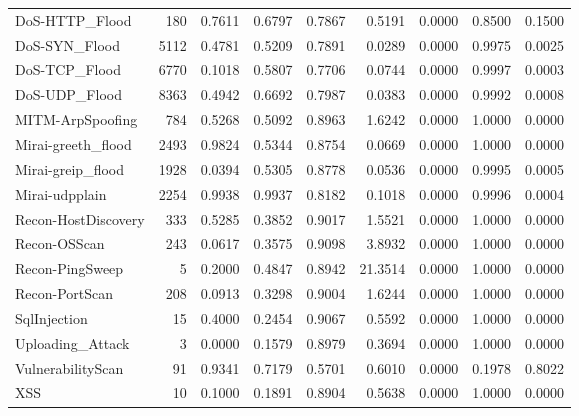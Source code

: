 \begin{tabular}{lrrrrrrrr}
DoS-HTTP\_Flood & 180 & 0.7611 & 0.6797 & 0.7867 & 0.5191 & 0.0000 & 0.8500 & 0.1500 \\
DoS-SYN\_Flood & 5112 & 0.4781 & 0.5209 & 0.7891 & 0.0289 & 0.0000 & 0.9975 & 0.0025 \\
DoS-TCP\_Flood & 6770 & 0.1018 & 0.5807 & 0.7706 & 0.0744 & 0.0000 & 0.9997 & 0.0003 \\
DoS-UDP\_Flood & 8363 & 0.4942 & 0.6692 & 0.7987 & 0.0383 & 0.0000 & 0.9992 & 0.0008 \\
MITM-ArpSpoofing & 784 & 0.5268 & 0.5092 & 0.8963 & 1.6242 & 0.0000 & 1.0000 & 0.0000 \\
Mirai-greeth\_flood & 2493 & 0.9824 & 0.5344 & 0.8754 & 0.0669 & 0.0000 & 1.0000 & 0.0000 \\
Mirai-greip\_flood & 1928 & 0.0394 & 0.5305 & 0.8778 & 0.0536 & 0.0000 & 0.9995 & 0.0005 \\
Mirai-udpplain & 2254 & 0.9938 & 0.9937 & 0.8182 & 0.1018 & 0.0000 & 0.9996 & 0.0004 \\
Recon-HostDiscovery & 333 & 0.5285 & 0.3852 & 0.9017 & 1.5521 & 0.0000 & 1.0000 & 0.0000 \\
Recon-OSScan & 243 & 0.0617 & 0.3575 & 0.9098 & 3.8932 & 0.0000 & 1.0000 & 0.0000 \\
Recon-PingSweep & 5 & 0.2000 & 0.4847 & 0.8942 & 21.3514 & 0.0000 & 1.0000 & 0.0000 \\
Recon-PortScan & 208 & 0.0913 & 0.3298 & 0.9004 & 1.6244 & 0.0000 & 1.0000 & 0.0000 \\
SqlInjection & 15 & 0.4000 & 0.2454 & 0.9067 & 0.5592 & 0.0000 & 1.0000 & 0.0000 \\
Uploading\_Attack & 3 & 0.0000 & 0.1579 & 0.8979 & 0.3694 & 0.0000 & 1.0000 & 0.0000 \\
VulnerabilityScan & 91 & 0.9341 & 0.7179 & 0.5701 & 0.6010 & 0.0000 & 0.1978 & 0.8022 \\
XSS & 10 & 0.1000 & 0.1891 & 0.8904 & 0.5638 & 0.0000 & 1.0000 & 0.0000 \\
\bottomrule
\end{tabular}
